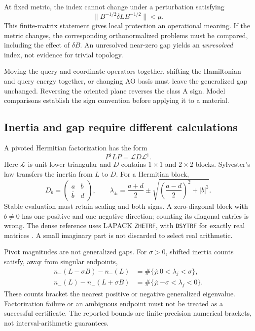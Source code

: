 At fixed metric, the index cannot change under a perturbation satisfying
\begin{equation}
 \|B^{-1/2}\delta L B^{-1/2}\|<\mu .
 \label{eq:localizer-stability}
\end{equation}
This finite-matrix statement gives local protection an operational
meaning. If the metric changes, the corresponding orthonormalized
problems must be compared, including the effect of $\delta B$.
An unresolved near-zero gap yields an \emph{unresolved} index,
not evidence for trivial topology.

Moving the query and coordinate operators together, shifting the
Hamiltonian and query energy together, or changing AO basis must
leave the generalized gap unchanged. Reversing the oriented plane
reverses the class A sign. Model comparisons establish the sign
convention before applying it to a material.

\subsection{Inertia and gap require different calculations}
A pivoted Hermitian factorization has the form
\begin{equation}
 P^\dagger LP=\mathcal L D\mathcal L^\dagger .
 \label{eq:ldl}
\end{equation}
Here $\mathcal L$ is unit lower triangular and $D$ contains
$1\times1$ and $2\times2$ blocks.
Sylvester's law transfers the inertia from $L$ to $D$.
For a Hermitian block,
\[
 D_b=\begin{pmatrix}a&b\\\overline b&d\end{pmatrix},\qquad
 \lambda_\pm=\frac{a+d}{2}
 \pm\sqrt{\left(\frac{a-d}{2}\right)^2+|b|^2}.
\]
Stable evaluation must retain scaling and both signs.
A zero-diagonal block with $b\ne0$ has one positive and one negative
direction; counting its diagonal entries is wrong.
The dense reference uses LAPACK \texttt{ZHETRF}, with \texttt{DSYTRF}
for exactly real matrices \cite{LapackLDL}. A small imaginary part is
not discarded to select real arithmetic.

Pivot magnitudes are not generalized gaps. For $\sigma>0$,
shifted inertia counts satisfy, away from singular endpoints,
\begin{equation}
 \begin{split}
 n_-(L-\sigma B)-n_-(L)&=\#\{j:0<\lambda_j<\sigma\},\\
 n_-(L)-n_-(L+\sigma B)&=\#\{j:-\sigma<\lambda_j<0\}.
 \end{split}
 \label{eq:gap-inertia}
\end{equation}
These counts bracket the nearest positive or negative generalized
eigenvalue. Factorization failure or an ambiguous endpoint must not
be treated as a successful certificate. The reported bounds are
finite-precision numerical brackets, not interval-arithmetic guarantees.

